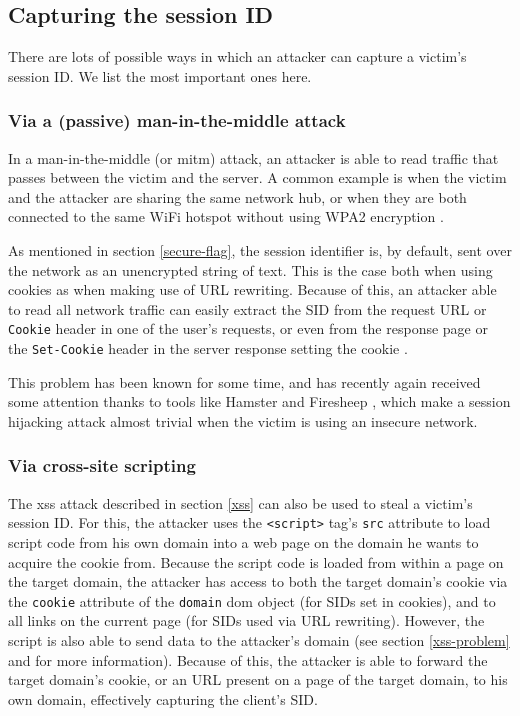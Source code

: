 \subsection{Capturing the session ID}\label{capturing}

There are lots of possible ways in which an attacker can capture a victim's session ID. We list the most important ones here.

\subsubsection{Via a (passive) man-in-the-middle attack}

In a man-in-the-middle (or \gls{mitm}) attack, an attacker is able to read traffic that passes between the victim and the server. A common example is when the victim and the attacker are sharing the same network hub, or when they are both connected to the same WiFi hotspot without using WPA2 encryption \cite{Arana2006}.

As mentioned in section \ref{secure-flag}, the session identifier is, by default, sent over the network as an unencrypted string of text. This is the case both when using cookies as when making use of URL rewriting. Because of this, an attacker able to read all network traffic can easily extract the SID from the request URL or \texttt{Cookie} header in one of the user's requests, or even from the response page or the \texttt{Set-Cookie} header in the server response setting the cookie \cite{Adida2008}.

This problem has been known for some time, and has recently again received some attention thanks to tools like Hamster \cite{Graham2007} and Firesheep \cite{Butler2010}, which make a session hijacking attack almost trivial when the victim is using an insecure network.

\subsubsection{Via cross-site scripting}

The \gls{xss} attack described in section \ref{xss} can also be used to steal a victim's session ID. For this, the attacker uses the \texttt{<script>} tag's \texttt{src} attribute to load script code from his own domain into a web page on the domain he wants to acquire the cookie from. Because the script code is loaded from within a page on the target domain, the attacker has access to both the target domain's cookie via the \texttt{cookie} attribute of the \texttt{domain} \gls{dom} object (for SIDs set in cookies), and to all links on the current page (for SIDs used via URL rewriting). However, the script is also able to send data to the attacker's domain (see section \ref{xss-problem} and \cite{Klein2002} for more information). Because of this, the attacker is able to forward the target domain's cookie, or an URL present on a page of the target domain, to his own domain, effectively capturing the client's SID.

